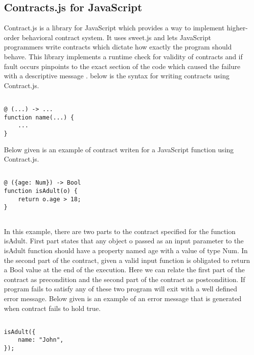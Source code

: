 \subsection{Contracts.js for JavaScript}

Contract.js is a library for JavaScript which provides a way to implement higher-order behavioral contract system. It uses sweet.js and lets JavaScript programmers write contracts which dictate how exactly the program should behave. This library implements a runtime check for validity of contracts and if fault occurs pinpoints to the exact section of the code which caused the failure with a descriptive message \cite{Contract11:online}.
below is the syntax for writing contracts using Contract.js.

\lstset{language=Java, caption=Contract syntax using Contract.js, captionpos=b, breaklines=true}       

\begin{lstlisting}[frame=single]

@ (...) -> ...
function name(...) {
    ...
}
\end{lstlisting}

Below given is an example of contract writen for a JavaScript function using Contract.js.

\lstset{language=Java, caption=Contract using Contract.js, captionpos=b, breaklines=true}       

\begin{lstlisting}[frame=single]

@ ({age: Num}) -> Bool
function isAdult(o) {
    return o.age > 18;
}
    
\end{lstlisting}

In this example, there are two parts to the contract specified for the function isAdult. First part states that any object o passed as an input parameter to the isAdult function should have a property named age with a value of type Num. In the second part of the contract, given a valid input function is obligated to return a Bool value at the end of the execution. Here we can relate the first part of the contract as precondition and the second part of the contract as postcondition. If program fails to satisfy any of these two program will exit with a well defined error message. Below given is an example of an error message that is generated when contract fails to hold true.
\linebreak

\begin{minipage}{\linewidth}
\lstset{language=Java, caption=Example of a failed contract, captionpos=b}       
\begin{lstlisting}[frame=single]

isAdult({
    name: "John",
});
    
\end{lstlisting}
\end{minipage}

